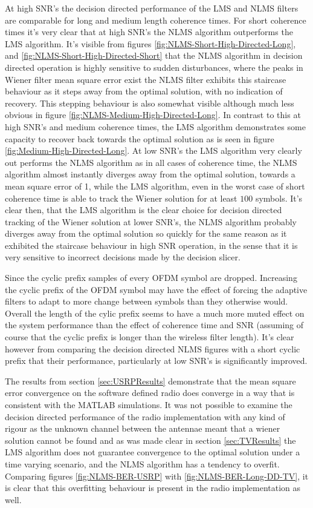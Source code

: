At high SNR's the decision directed performance of the LMS and %
NLMS filters are comparable for long and medium length coherence %
times. For short coherence times it's very clear that at high %
SNR's the NLMS algorithm outperforms the LMS algorithm. It's visible from %
figures \ref{fig:NLMS-Short-High-Directed-Long}, and
\ref{fig:NLMS-Short-High-Directed-Short} that the NLMS algorithm %
in decision directed operation is highly sensitive to sudden disturbances, %
where the peaks in Wiener filter mean square error exist the %
NLMS filter exhibits this staircase behaviour as it steps away %
from the optimal solution, with no indication of recovery. This %
stepping behaviour is also somewhat visible although much less %
obvious in figure \ref{fig:NLMS-Medium-High-Directed-Long}. %
In contrast to this at high SNR's and medium coherence times, %
the LMS algorithm demonstrates some capacity to recover %
back towards the optimal solution as is seen in figure %
\ref{fig:Medium-High-Directed-Long}. At low SNR's the %
LMS algorithm very clearly out performs the NLMS algorithm %
as in all cases of coherence time, the NLMS algorithm almost %
instantly diverges away from the optimal solution, towards %
a mean square error of 1, while the LMS algorithm, even in the %
worst case of short coherence time is able to track the %
Wiener solution for at least $100$ symbols. It's clear then, that %
the LMS algorithm is the clear choice for decision directed tracking %
of the Wiener solution at lower SNR's, the NLMS algorithm probably %
diverges away from the optimal solution so quickly for the same %
reason as it exhibited the staircase behaviour in high SNR operation, in %
the sense that it is very sensitive to incorrect decisions made by the %
decision slicer. 

Since the cyclic prefix samples of every OFDM symbol are dropped. %
Increasing the cyclic prefix of the OFDM symbol may have the %
effect of forcing the adaptive filters to adapt to more change %
between symbols than they otherwise would. Overall the length %
of the cylic prefix seems to have a much more %
muted effect on the system performance than the effect of %
coherence time and SNR (assuming of course that the cyclic %
prefix is longer than the wireless filter length). It's clear however %
from comparing the decision directed NLMS figures with a short %
cyclic prefix that their performance, particularly at low SNR's is %
significantly improved.

The results from section \ref{sec:USRPResults} demonstrate that %
the mean square error convergence on the software defined %
radio does converge in a way that is consistent with the MATLAB %
simulations. It was not possible to examine the decision directed %
performance of the radio implementation with any kind of rigour %
as the unknown channel between the antennae meant that %
a wiener solution cannot be found and as was made clear in section %
\ref{sec:TVResults} the LMS algorithm does not guarantee %
convergence to the optimal solution under a time varying scenario, and %
the NLMS algorithm has a tendency to overfit. Comparing figures %
\ref{fig:NLMS-BER-USRP} with \ref{fig:NLMS-BER-Long-DD-TV}, it is %
clear that this overfitting behaviour is present in the radio implementation %
as well.

